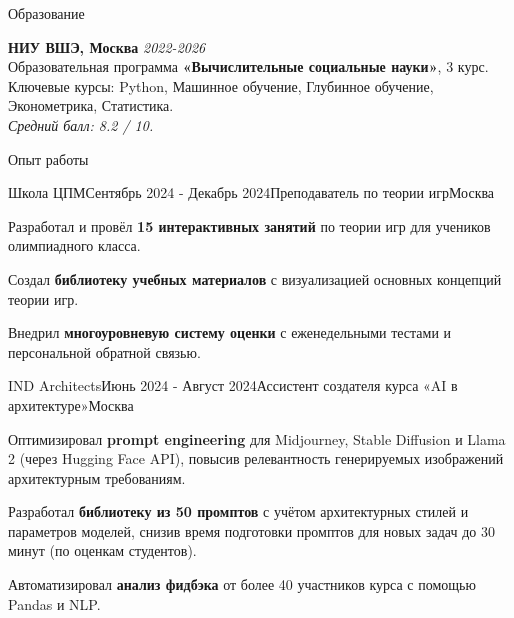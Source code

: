 \documentclass[10pt]{resume} %
\begin{document}
\begin{rSection}{Образование}
	
	\textbf{НИУ ВШЭ, Москва} \hfill \textit{2022-2026} \\ 
	Образовательная программа \textbf{«Вычислительные социальные науки»}, 3 курс. \\
 Ключевые курсы: Python, Машинное обучение, Глубинное обучение, Эконометрика, Статистика. \\
 	\textit{Средний балл: 8.2 / 10.}
	
\end{rSection}


\begin{rSection}{Опыт работы}

\begin{rSubsection}{Школа ЦПМ}{Сентябрь 2024 - Декабрь 2024}{Преподаватель по теории игр}{Москва}
\item Разработал и провёл \textbf{15 интерактивных занятий} по теории игр для учеников олимпиадного класса.
\item Создал \textbf{библиотеку учебных материалов} с визуализацией основных концепций теории игр.
\item Внедрил \textbf{многоуровневую систему оценки} с еженедельными тестами и персональной обратной связью.
\end{rSubsection}

	\begin{rSubsection}{IND Architects}{Июнь 2024 - Август 2024}{Ассистент создателя курса «AI в архитектуре»}{Москва}
		\item  Оптимизировал \textbf{prompt engineering} для Midjourney, Stable Diffusion и Llama 2 (через Hugging Face API), повысив релевантность генерируемых изображений архитектурным требованиям.
		\item  Разработал \textbf{библиотеку из 50 промптов} с учётом архитектурных стилей и параметров моделей, снизив время подготовки промптов для новых задач до 30 минут (по оценкам студентов).
  \item Автоматизировал \textbf{анализ фидбэка}  от более 40 участников курса с помощью Pandas и NLP.
	\end{rSubsection}

    
\end{rSection}
\end{document}
